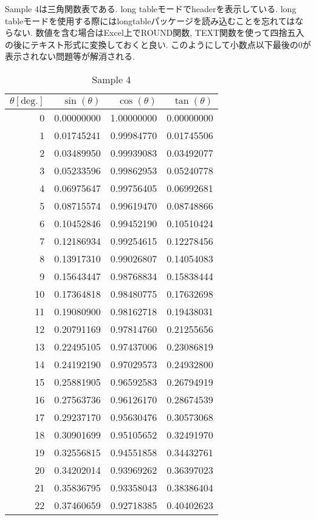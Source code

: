 \documentclass{jsarticle}
\begin{document}
Sample 4は三角関数表である.
long tableモードでheaderを表示している.
long tableモードを使用する際にはlongtableパッケージを読み込むことを忘れてはならない.
数値を含む場合はExcel上でROUND関数, TEXT関数を使って四捨五入の後にテキスト形式に変換しておくと良い.
このようにして小数点以下最後の0が表示されない問題等が解消される.
\begin{longtable}{|r|r|r|r|}
	\caption{Sample 4}
	\label{sample4}
	\\ \hline\centering
	$\theta\mathrm{[deg.]}$	&$\sin(\theta)$	&$\cos(\theta)$	&$\tan(\theta)$	\\ \hline\endhead
	0	&0.00000000	&1.00000000	&0.00000000	\\ \hline
	1	&0.01745241	&0.99984770	&0.01745506	\\ \hline
	2	&0.03489950	&0.99939083	&0.03492077	\\ \hline
	3	&0.05233596	&0.99862953	&0.05240778	\\ \hline
	4	&0.06975647	&0.99756405	&0.06992681	\\ \hline
	5	&0.08715574	&0.99619470	&0.08748866	\\ \hline
	6	&0.10452846	&0.99452190	&0.10510424	\\ \hline
	7	&0.12186934	&0.99254615	&0.12278456	\\ \hline
	8	&0.13917310	&0.99026807	&0.14054083	\\ \hline
	9	&0.15643447	&0.98768834	&0.15838444	\\ \hline
	10	&0.17364818	&0.98480775	&0.17632698	\\ \hline
	11	&0.19080900	&0.98162718	&0.19438031	\\ \hline
	12	&0.20791169	&0.97814760	&0.21255656	\\ \hline
	13	&0.22495105	&0.97437006	&0.23086819	\\ \hline
	14	&0.24192190	&0.97029573	&0.24932800	\\ \hline
	15	&0.25881905	&0.96592583	&0.26794919	\\ \hline
	16	&0.27563736	&0.96126170	&0.28674539	\\ \hline
	17	&0.29237170	&0.95630476	&0.30573068	\\ \hline
	18	&0.30901699	&0.95105652	&0.32491970	\\ \hline
	19	&0.32556815	&0.94551858	&0.34432761	\\ \hline
	20	&0.34202014	&0.93969262	&0.36397023	\\ \hline
	21	&0.35836795	&0.93358043	&0.38386404	\\ \hline
	22	&0.37460659	&0.92718385	&0.40402623	\\ \hline

\end{longtable}
\end{document}

